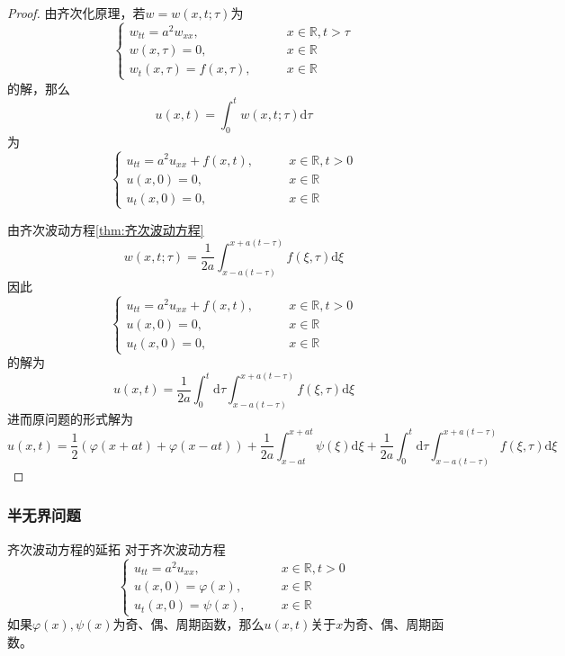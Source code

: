 \documentclass[lang = cn, scheme = chinese, thmcnt = section]{elegantbook}
\newcommand{\R}{\mathbb{R}}            %
\newcommand{\dd}{\mathrm{d}}           %
\begin{document}
\begin{proof}
	由齐次化原理，若$w=w(x,t;\tau)$为
	$$
	\begin{cases}
		w_{tt}=a^2w_{xx},\qquad & x\in\R,t>\tau\\
		w(x,\tau)=0,\qquad & x\in\R\\
		w_t(x,\tau)=f(x,\tau),\qquad & x\in\R
	\end{cases}
	$$
	的解，那么%
	$$
	u(x,t)=\int_{0}^{t}w(x,t;\tau)\dd\tau
	$$
	为
	$$
	\begin{cases}
		u_{tt}=a^2u_{xx}+f(x,t),\qquad & x\in\R,t>0\\
		u(x,0)=0,\qquad & x\in\R\\
		u_t(x,0)=0,\qquad & x\in\R
	\end{cases}
	$$
	
	由齐次波动方程\ref{thm:齐次波动方程}
	$$
	w(x,t;\tau)=\frac{1}{2a}\int_{x-a(t-\tau)}^{x+a(t-\tau)}f(\xi,\tau)\dd\xi
	$$
	因此
	$$
	\begin{cases}
		u_{tt}=a^2u_{xx}+f(x,t),\qquad & x\in\R,t>0\\
		u(x,0)=0,\qquad & x\in\R\\
		u_t(x,0)=0,\qquad & x\in\R
	\end{cases}
	$$
	的解为
	$$
	u(x,t)=\frac{1}{2a}\int_{0}^{t}\dd\tau\int_{x-a(t-\tau)}^{x+a(t-\tau)}f(\xi,\tau)\dd\xi
	$$
	进而原问题的形式解为
	$$
	u(x,t)
	= \frac{1}{2}(\varphi(x+at)+\varphi(x-at))+\frac{1}{2a}\int_{x-at}^{x+at}\psi(\xi)\dd\xi+\frac{1}{2a}\int_{0}^{t}\dd\tau\int_{x-a(t-\tau)}^{x+a(t-\tau)}f(\xi,\tau)\dd\xi
	$$
\end{proof}

\subsubsection{半无界问题}

\begin{lemma}{}{齐次波动方程的延拓}
	对于齐次波动方程
	$$
	\begin{cases}
		u_{tt}=a^2u_{xx},\qquad & x\in\R,t>0\\
		u(x,0)=\varphi(x),\qquad & x\in\R\\
		u_t(x,0)=\psi(x),\qquad & x\in\R
	\end{cases}
	$$
	如果$\varphi(x),\psi(x)$为奇、偶、周期函数，那么$u(x,t)$关于$x$为奇、偶、周期函数。
\end{lemma}
\end{document}
